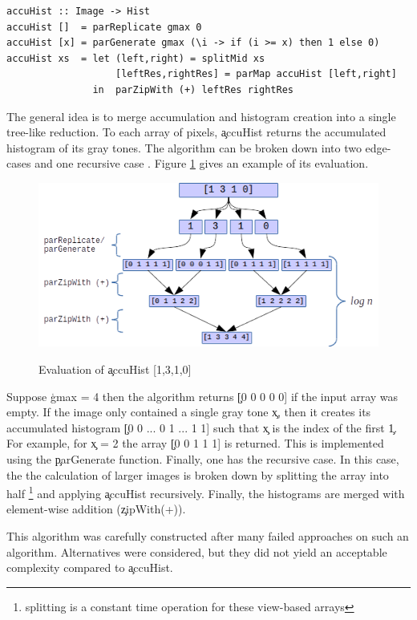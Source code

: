   \begin{lstlisting}
accuHist :: Image -> Hist
accuHist []  = parReplicate gmax 0
accuHist [x] = parGenerate gmax (\i -> if (i >= x) then 1 else 0)
accuHist xs  = let (left,right) = splitMid xs
                   [leftRes,rightRes] = parMap accuHist [left,right]
               in  parZipWith (+) leftRes rightRes
  \end{lstlisting}
  The general idea is to merge accumulation and histogram creation
  into a single tree-like reduction. To each array of pixels, \c{accuHist}
  returns the accumulated histogram of its gray tones.
  The algorithm can be broken down into two edge-cases and one recursive case
  . Figure \ref{figure:accuHist} gives an example of its evaluation.
  
  \begin{figure}[h]
    \centering
    \includegraphics[width=\linewidth]{accuHist}
    \label{figure:accuHist}
    \caption[Parallel Histogram Accumulation]{Evaluation of \c{accuHist [1,3,1,0]}}
  \end{figure}
  
  Suppose \c{gmax = 4} then the algorithm returns \c{[0 0 0 0 0]} if
  the input array was empty. If the image only contained a single gray tone
  \c{x}, then it creates its accumulated histogram
  \c{[0 0 ... 0 1 ... 1 1]} such that \c{x} is the index
  of the first \c{1}.
  For example, for \c{x = 2} the array
  \c{[0 0 1 1 1]} is returned. This is implemented using the \c{parGenerate} function.
  Finally, one has the recursive case. In this case, the the calculation
  of larger images is broken down by splitting the array into half
  \footnote{splitting is a constant time operation
  for these view-based arrays} and applying \c{accuHist}
  recursively. Finally, the histograms are merged with element-wise addition
  ({\c{zipWith(+)}}).
  
  This algorithm was carefully constructed after many failed approaches
  on such an algorithm. Alternatives were considered, but they did not
  yield an acceptable complexity compared to \c{accuHist}.

